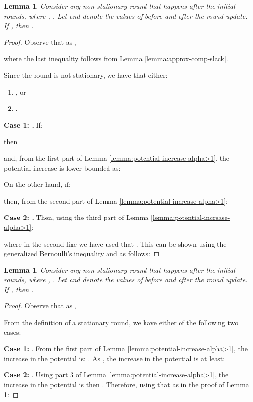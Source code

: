 \documentclass[11pt]{article}
\newtheorem{lemma}[theorem]{Lemma}
\begin{document}
\begin{lemma}\label{lemma:alpha>1-large-sum-yi}
Consider any non-stationary round that happens after the initial  rounds, where , . Let  and  denote the values of  before and after the round update. If , then .
\end{lemma}
\begin{proof}
Observe that as ,

where the last inequality follows from Lemma \ref{lemma:approx-comp-slack}.

Since the round is not stationary, we have that either: 
\begin{enumerate}
\item , or
\item .
\end{enumerate}
\noindent\textbf{Case 1: .} If: 

then

and, from the first part of Lemma \ref{lemma:potential-increase-alpha>1}, the potential increase is lower bounded as:

On the other hand, if:

then, from the second part of Lemma \ref{lemma:potential-increase-alpha>1}:


\noindent\textbf{Case 2: .} Then, using the third part of Lemma \ref{lemma:potential-increase-alpha>1}:

where in the second line we have used that . This can be shown using the generalized Bernoulli's inequality and  as follows:

\end{proof}

\begin{lemma}\label{lemma:alpha>1-mul-inc-non-stat}
Consider any non-stationary round that happens after the initial  rounds, where , . Let  and  denote the values of  before and after the round update. If , then .
\end{lemma}
\begin{proof}
Observe that as ,


From the definition of a stationary round, we have either of the following two cases:

\noindent\textbf{Case 1:} . 
From the first part of Lemma \ref{lemma:potential-increase-alpha>1}, the increase in the potential is: . As , the increase in the potential is at least:


\noindent\textbf{Case 2:} . Using part 3 of Lemma \ref{lemma:potential-increase-alpha>1}, the increase in the potential is then . Therefore, using that  as in the proof of Lemma \ref{lemma:alpha>1-large-sum-yi}:


\end{proof}
\end{document}
